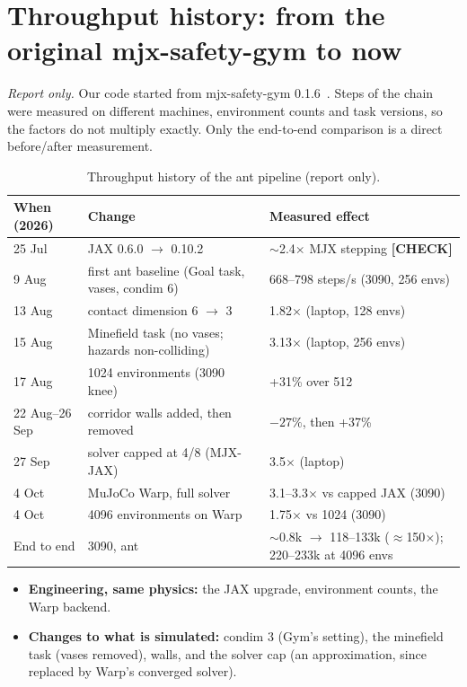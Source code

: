 \documentclass[sigconf,review]{acmart}
\newcommand{\statustag}[2]{\textcolor{#1}{\textsf{\scriptsize\bfseries[#2]}}}
\newcommand{\CHECK}{\statustag{orange!85!black}{CHECK}\hspace{0.3em}}
\begin{document}
\section{Throughput history: from the original mjx-safety-gym to now}
\label{app:speed}
\noindent\textit{Report only.} Our code started from mjx-safety-gym 0.1.6~\cite{vanderhart_mjxsafetygym}. Steps of the chain were measured on different machines, environment counts and task versions, so the factors do not multiply exactly. Only the end-to-end comparison is a direct before/after measurement.
\begin{table}[t]
\caption{Throughput history of the ant pipeline (report only).}
\label{tab:history}
\footnotesize
\begin{tabular}{lll}
\toprule
When (2026) & Change & Measured effect \\
\midrule
25 Jul & JAX 0.6.0 $\to$ 0.10.2 & $\sim$2.4$\times$ MJX stepping \CHECK \\
9 Aug & first ant baseline (Goal task, vases, condim 6) & 668--798 steps/s (3090, 256 envs) \\
13 Aug & contact dimension 6 $\to$ 3 & 1.82$\times$ (laptop, 128 envs) \\
15 Aug & Minefield task (no vases; hazards non-colliding) & 3.13$\times$ (laptop, 256 envs) \\
17 Aug & 1024 environments (3090 knee) & +31\% over 512 \\
22 Aug--26 Sep & corridor walls added, then removed & $-27\%$, then +37\% \\
27 Sep & solver capped at 4/8 (MJX-JAX) & 3.5$\times$ (laptop) \\
4 Oct & MuJoCo Warp, full solver & 3.1--3.3$\times$ vs capped JAX (3090) \\
4 Oct & 4096 environments on Warp & 1.75$\times$ vs 1024 (3090) \\
\midrule
End to end & 3090, ant & $\sim$0.8k $\to$ 118--133k ($\approx$150$\times$); 220--233k at 4096 envs \\
\bottomrule
\end{tabular}
\end{table}
\begin{itemize}
\item \textbf{Engineering, same physics:} the JAX upgrade, environment counts, the Warp backend.
\item \textbf{Changes to what is simulated:} condim 3 (Gym's setting), the minefield task (vases removed), walls, and the solver cap (an approximation, since replaced by Warp's converged solver).
\end{itemize}
\end{document}
